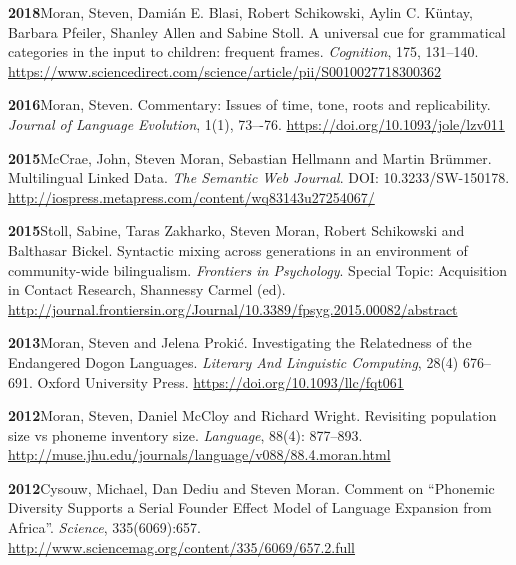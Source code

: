 \documentclass[11pt]{article}
\newcommand{\hangpara}{
 \setlength{\parindent}{0in} %
 \hangindent=0.42in %
}
\begin{document}

\hangpara
{\bf 2018}\hspace{1ex}Moran, Steven, Dami{\'a}n E. Blasi, Robert Schikowski, Aylin C. K{\"u}ntay, Barbara Pfeiler, Shanley Allen and Sabine Stoll. A universal cue for grammatical categories in the input to children: frequent frames. \textit{Cognition}, 175, 131--140. \url{https://www.sciencedirect.com/science/article/pii/S0010027718300362}

\hangpara
\vskip 6pt
{\bf 2016}\hspace{1ex}Moran, Steven. Commentary: Issues of time, tone, roots and replicability. \textit{Journal of Language Evolution}, 1(1), 73–-76. \url{https://doi.org/10.1093/jole/lzv011}

\hangpara
\vskip 6pt
{\bf 2015}\hspace{1ex}McCrae, John, Steven Moran, Sebastian Hellmann and Martin Br{\"u}mmer. Multilingual Linked Data. \textit{The Semantic Web Journal}. DOI: 10.3233/SW-150178. \url{http://iospress.metapress.com/content/wq83143u27254067/}

\vskip 6pt
\hangpara
{\bf 2015}\hspace{1ex}Stoll, Sabine, Taras Zakharko, Steven Moran, Robert Schikowski and Balthasar Bickel. Syntactic mixing across generations in an environment of community-wide bilingualism. \textit{Frontiers in Psychology}. Special Topic: Acquisition in Contact Research, Shannessy Carmel (ed). \url{http://journal.frontiersin.org/Journal/10.3389/fpsyg.2015.00082/abstract}

\vskip 6pt
\hangpara
{\bf 2013}\hspace{1ex}Moran, Steven and Jelena Proki{\'c}. Investigating the Relatedness of the Endangered Dogon Languages. \textit{Literary And Linguistic Computing}, 28(4) 676--691. Oxford University Press. \url{https://doi.org/10.1093/llc/fqt061}

\vskip 6pt
\hangpara
{\bf 2012}\hspace{1ex}Moran, Steven, Daniel McCloy and Richard Wright. Revisiting population size vs phoneme inventory size. {\it Language}, 88(4): 877--893. \url{http://muse.jhu.edu/journals/language/v088/88.4.moran.html}

\vskip 6pt
\hangpara
{\bf 2012}\hspace{1ex}Cysouw, Michael, Dan Dediu and Steven Moran. Comment on ``Phonemic Diversity Supports a Serial Founder Effect Model of Language Expansion from Africa''. \textit{Science}, 335(6069):657. \url{http://www.sciencemag.org/content/335/6069/657.2.full}
\end{document}
